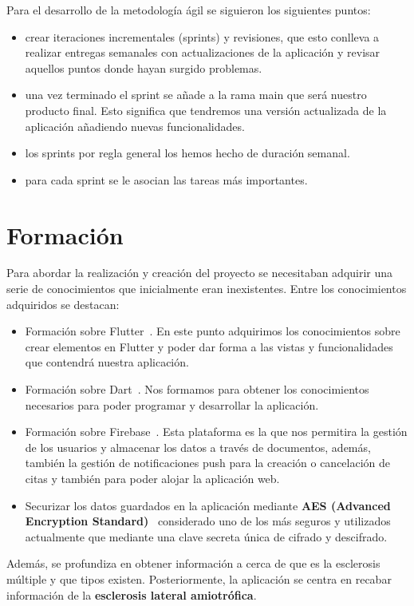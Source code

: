 Para el desarrollo de la metodología ágil se siguieron los siguientes puntos:
\begin{itemize}
\item crear iteraciones incrementales (sprints) y revisiones, que esto conlleva a realizar entregas semanales con actualizaciones de la aplicación y revisar aquellos puntos donde hayan surgido problemas.
\item una vez terminado el sprint se añade a la rama main que será nuestro producto final. Esto significa que tendremos una versión actualizada de la aplicación añadiendo nuevas funcionalidades.
\item los sprints por regla general los hemos hecho de duración semanal. 
\item para cada sprint se le asocian las tareas más importantes.
\end{itemize}

\section{Formación}
Para abordar la realización y creación del proyecto se necesitaban adquirir una serie de conocimientos que inicialmente eran inexistentes. Entre los conocimientos adquiridos se destacan:
\begin{itemize}
\item Formación sobre Flutter~\cite{flutter,formacionFlutter}. En este punto adquirimos los conocimientos sobre crear elementos en Flutter y poder dar forma a las vistas y funcionalidades que contendrá nuestra aplicación.
\item Formación sobre Dart~\cite{dart}. Nos formamos para obtener los conocimientos necesarios para poder programar y desarrollar la aplicación.
\item Formación sobre Firebase~\cite{firebase}. Esta plataforma es la que nos permitira la gestión de los usuarios y almacenar los datos a través de documentos, además, también la gestión de notificaciones push para la creación o cancelación de citas y también para poder alojar la aplicación web.
\item Securizar los datos guardados en la aplicación mediante \textbf{AES (Advanced Encryption Standard)}~\cite{wiki:aes} considerado uno de los más seguros y utilizados actualmente que mediante una clave secreta única de cifrado y descifrado.
\end{itemize}

Además, se profundiza en obtener información a cerca de que es la esclerosis múltiple y que tipos existen. Posteriormente, la aplicación se centra en recabar información de la \textbf{esclerosis lateral amiotrófica}.


